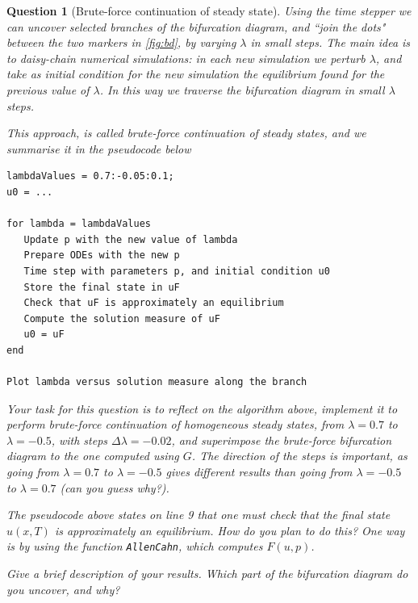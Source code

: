 \documentclass[a4paper]{siamart220329}
\theoremstyle{plain}
\newtheorem{question}{Question}
\begin{document}
\begin{question}[Brute-force continuation of steady state]\label{question:BruteForce}
Using the time stepper we can uncover selected branches of the bifurcation diagram,
and ``join the dots" between the two markers in \cref{fig:bd}, by varying $\lambda$
in small steps. The main idea is to daisy-chain numerical simulations: in each new
simulation we perturb $\lambda$, and take as initial condition for the new simulation
the equilibrium found for the previous value of $\lambda$. In this way we traverse the
bifurcation diagram in small $\lambda$ steps. 

This approach, is called \textit{brute-force} continuation of steady states,
and we summarise it in the pseudocode below

\begin{lstlisting}
lambdaValues = 0.7:-0.05:0.1;
u0 = ... 

for lambda = lambdaValues
   Update p with the new value of lambda
   Prepare ODEs with the new p
   Time step with parameters p, and initial condition u0
   Store the final state in uF
   Check that uF is approximately an equilibrium
   Compute the solution measure of uF 
   u0 = uF
end

Plot lambda versus solution measure along the branch
\end{lstlisting}

Your task for this question is to reflect on the algorithm above, implement it to
perform brute-force continuation of homogeneous steady states, from $\lambda = 0.7$
to $\lambda = -0.5$, with steps $\Delta \lambda=-0.02$, and superimpose the
brute-force bifurcation diagram to the one computed using $G$. The direction of the steps is
important, as going from $\lambda = 0.7$ to $\lambda=-0.5$ gives different results
than going from  $\lambda =-0.5$ to  $\lambda=0.7$ (can you guess why?). 

The pseudocode above states on line 9 that one must check that the final state
$u(x,T)$ is approximately an equilibrium. How do you plan to do this? One way
is by using the function \lstinline|AllenCahn|, which computes $F(u,p)$.

Give a brief description of your results. Which part of the bifurcation diagram do
you uncover, and why?
\end{question}
\end{document}
